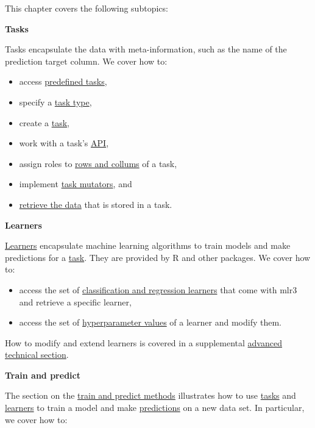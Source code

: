 \documentclass[]{article}
\providecommand{\tightlist}{%
  \setlength{\itemsep}{0pt}\setlength{\parskip}{0pt}}
\begin{document}
This chapter covers the following subtopics:

\textbf{Tasks}

Tasks encapsulate the data with meta-information, such as the name of the prediction target column.
We cover how to:

\begin{itemize}
\tightlist
\item
  access \protect\hyperlink{tasks-predefined}{predefined tasks},
\item
  specify a \protect\hyperlink{tasks-types}{task type},
\item
  create a \protect\hyperlink{tasks-creation}{task},
\item
  work with a task's \protect\hyperlink{tasks-api}{API},
\item
  assign roles to \protect\hyperlink{tasks-roles}{rows and collums} of a task,
\item
  implement \protect\hyperlink{tasks-mutators}{task mutators}, and
\item
  \protect\hyperlink{tasks-retrieved}{retrieve the data} that is stored in a task.
\end{itemize}

\textbf{Learners}

\protect\hyperlink{learners}{Learners} encapsulate machine learning algorithms to train models and make predictions for a \protect\hyperlink{tasks}{task}.
They are provided by R and other packages.
We cover how to:

\begin{itemize}
\tightlist
\item
  access the set of \protect\hyperlink{learners-predefined}{classification and regression learners} that come with mlr3 and retrieve a specific learner,
\item
  access the set of \protect\hyperlink{learners-predefined}{hyperparameter values} of a learner and modify them.
\end{itemize}

How to modify and extend learners is covered in a supplemental \protect\hyperlink{ext-learner}{advanced technical section}.

\textbf{Train and predict}

The section on the \protect\hyperlink{train-predict}{train and predict methods} illustrates how to use \protect\hyperlink{tasks}{tasks} and \protect\hyperlink{learners}{learners} to train a model and make \protect\hyperlink{predicting}{predictions} on a new data set.
In particular, we cover how to:
\end{document}
